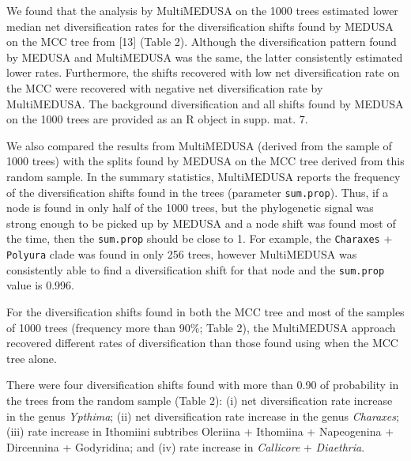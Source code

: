 \documentclass[10pt]{article}
\begin{document}
We found that the analysis by MultiMEDUSA on the 1000 trees estimated
lower median net diversification rates for the diversification shifts
found by MEDUSA on the MCC tree from {[}13{]} (Table 2). Although the
diversification pattern found by MEDUSA and MultiMEDUSA was the same,
the latter consistently estimated lower rates. Furthermore, the shifts
recovered with low net diversification rate on the MCC were recovered
with negative net diversification rate by MultiMEDUSA. The background
diversification and all shifts found by MEDUSA on the 1000 trees are
provided as an R object in supp. mat. 7.

We also compared the results from MultiMEDUSA (derived from the sample
of 1000 trees) with the splits found by MEDUSA on the MCC tree derived
from this random sample. In the summary statistics, MultiMEDUSA reports
the frequency of the diversification shifts found in the trees
(parameter \texttt{sum.prop}). Thus, if a node is found in only half of
the 1000 trees, but the phylogenetic signal was strong enough to be
picked up by MEDUSA and a node shift was found most of the time, then
the \texttt{sum.prop} should be close to 1. For example, the
\texttt{Charaxes} + \texttt{Polyura} clade was found in only 256 trees,
however MultiMEDUSA was consistently able to find a diversification
shift for that node and the \texttt{sum.prop} value is 0.996.

For the diversification shifts found in both the MCC tree and most of
the samples of 1000 trees (frequency more than 90\%; Table 2), the
MultiMEDUSA approach recovered different rates of diversification than
those found using when the MCC tree alone.

There were four diversification shifts found with more than 0.90 of
probability in the trees from the random sample (Table 2): (i) net
diversification rate increase in the genus \emph{Ypthima}; (ii) net
diversification rate increase in the genus \emph{Charaxes}; (iii) rate
increase in Ithomiini subtribes Oleriina + Ithomiina + Napeogenina +
Dircennina + Godyridina; and (iv) rate increase in \emph{Callicore} +
\emph{Diaethria}.
\end{document}
